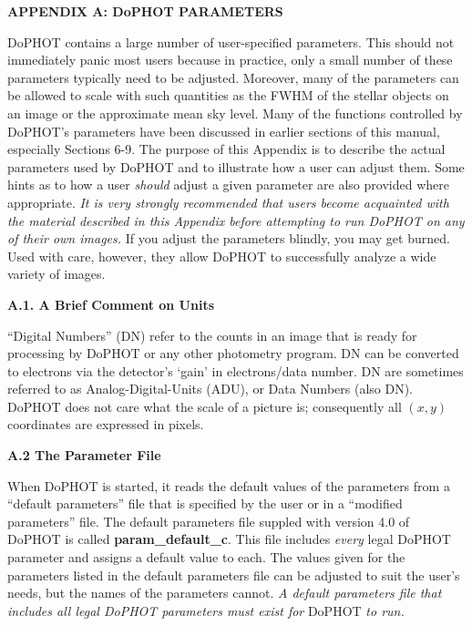 \centerline{\bf APPENDIX A:  DoPHOT PARAMETERS}

DoPHOT contains a large number of user-specified parameters.
This should not immediately panic most users because in
practice, only a small number of these parameters typically
need to be adjusted.  Moreover, many
of the parameters can be allowed to scale with such quantities as the 
FWHM of the stellar objects on an image or the 
approximate mean sky level.  Many of the functions controlled
by DoPHOT's parameters have been discussed
in earlier sections of this manual, especially Sections 6-9.  
The purpose of this Appendix is
to describe the actual parameters used by DoPHOT
and to illustrate how a user can adjust them.  Some hints as to how
a user {\it should} adjust a given parameter are also provided where
appropriate.  {\it It is
very strongly recommended that users become acquainted 
with the material described 
in this Appendix before attempting to run DoPHOT on any
of their own images.}  If you adjust the parameters
blindly, you may get burned.  Used with care, however, they allow
DoPHOT to successfully analyze a wide variety of images.

\centerline{\bf A.1. A Brief Comment on Units}

``Digital Numbers'' (DN) refer to the counts in an image that is 
ready for processing by DoPHOT or any other photometry program.
DN can be converted to electrons via the detector's 
`gain' in electrons/data number.
DN are sometimes referred to as Analog-Digital-Units
(ADU), or Data Numbers (also DN).  DoPHOT does not care what the
scale of a picture is; consequently all $(x,y)$ coordinates are
expressed in pixels.  

\centerline{\bf A.2 The Parameter File}

When DoPHOT is started, it reads the default values of the parameters
from a ``default parameters'' file that is specified by the user or
in a ``modified parameters'' file.  The default parameters file suppled with 
version 4.0 of DoPHOT is called {\bf param\_default\_c}.  This file includes
{\it every} legal DoPHOT parameter and assigns a default value to
each.  The values given for the parameters listed in the default parameters 
file can be adjusted to suit the user's needs, but the names of the 
parameters cannot. {\it A default parameters file that includes all legal 
DoPHOT parameters must exist for} DoPHOT {\it to run.}  

